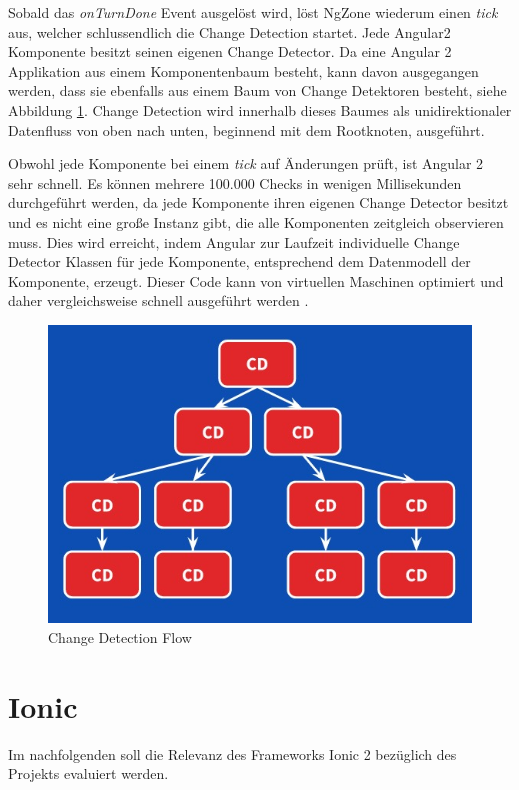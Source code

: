 Sobald das \emph{onTurnDone} Event ausgelöst wird, löst NgZone wiederum einen \emph{tick} aus, welcher schlussendlich die Change Detection startet.
Jede Angular2 Komponente besitzt seinen eigenen Change Detector. Da eine Angular 2 Applikation aus einem Komponentenbaum besteht,
kann davon ausgegangen werden, dass sie ebenfalls aus einem Baum von Change Detektoren besteht, siehe Abbildung \ref{cdflow}.
Change Detection wird innerhalb dieses Baumes als unidirektionaler Datenfluss von oben nach unten, beginnend mit dem Rootknoten, ausgeführt.

Obwohl jede Komponente bei einem \emph{tick} auf Änderungen prüft, ist Angular 2 sehr schnell. Es können mehrere 100.000 Checks in wenigen Millisekunden durchgeführt werden,
da jede Komponente ihren eigenen Change Detector besitzt und es nicht eine große Instanz gibt, die alle Komponenten zeitgleich observieren muss.
Dies wird erreicht, indem Angular zur Laufzeit individuelle Change Detector Klassen für jede Komponente, entsprechend dem Datenmodell der Komponente, erzeugt.
Dieser Code kann von virtuellen Maschinen optimiert und daher vergleichsweise schnell ausgeführt werden \cite{changedetection-explained}.

\vspace{1cm}

\begin{figure}[ht]
 \centering
 \includegraphics[width=0.7\linewidth]{kapitel3/cd-tree.jpg}
 \caption{Change Detection Flow \cite{changedetection-explained}}
\label{cdflow}
\end{figure}

\newpage
\section{Ionic}

Im nachfolgenden soll die Relevanz des Frameworks Ionic 2 bezüglich des Projekts \projectname{} evaluiert werden.

